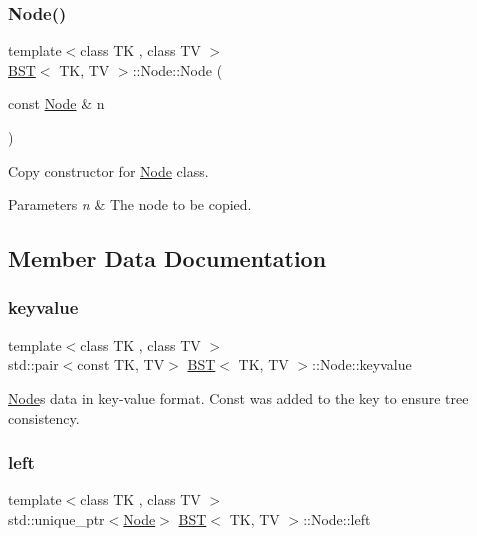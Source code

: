 \subsubsection{\texorpdfstring{Node()}{Node()}\hspace{0.1cm}{\footnotesize\ttfamily [3/3]}}
{\footnotesize\ttfamily template$<$class TK , class TV $>$ \\
\hyperlink{classBST}{B\+ST}$<$ TK, TV $>$\+::Node\+::\+Node (\begin{DoxyParamCaption}\item[{const \hyperlink{structBST_1_1Node}{Node} \&}]{n }\end{DoxyParamCaption})\hspace{0.3cm}{\ttfamily [inline]}}



Copy constructor for \hyperlink{structBST_1_1Node}{Node} class. 


\begin{DoxyParams}{Parameters}
{\em n} & The node to be copied. \\
\hline
\end{DoxyParams}


\subsection{Member Data Documentation}
\mbox{\label{structBST_1_1Node_a2ecbd07318d0f15613f60cccbdf10ac2}} 
\subsubsection{\texorpdfstring{keyvalue}{keyvalue}}
{\footnotesize\ttfamily template$<$class TK , class TV $>$ \\
std\+::pair$<$const TK, TV$>$ \hyperlink{classBST}{B\+ST}$<$ TK, TV $>$\+::Node\+::keyvalue}

\hyperlink{structBST_1_1Node}{Node}\textquotesingle{}s data in key-\/value format. Const was added to the key to ensure tree consistency. \mbox{\label{structBST_1_1Node_ac52d495eea342da75bb8970963fedc4c}} 
\subsubsection{\texorpdfstring{left}{left}}
{\footnotesize\ttfamily template$<$class TK , class TV $>$ \\
std\+::unique\+\_\+ptr$<$\hyperlink{structBST_1_1Node}{Node}$>$ \hyperlink{classBST}{B\+ST}$<$ TK, TV $>$\+::Node\+::left}


